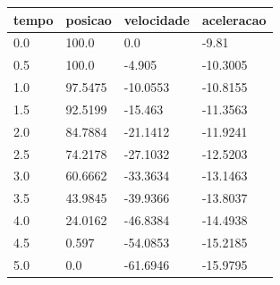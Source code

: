 \begin{tabular}{llll}
\toprule
tempo & posicao & velocidade & aceleracao \\
\midrule
0.0 & 100.0 & 0.0 & -9.81 \\
0.5 & 100.0 & -4.905 & -10.3005 \\
1.0 & 97.5475 & -10.0553 & -10.8155 \\
1.5 & 92.5199 & -15.463 & -11.3563 \\
2.0 & 84.7884 & -21.1412 & -11.9241 \\
2.5 & 74.2178 & -27.1032 & -12.5203 \\
3.0 & 60.6662 & -33.3634 & -13.1463 \\
3.5 & 43.9845 & -39.9366 & -13.8037 \\
4.0 & 24.0162 & -46.8384 & -14.4938 \\
4.5 & 0.597 & -54.0853 & -15.2185 \\
5.0 & 0.0 & -61.6946 & -15.9795 \\
\bottomrule
\end{tabular}
